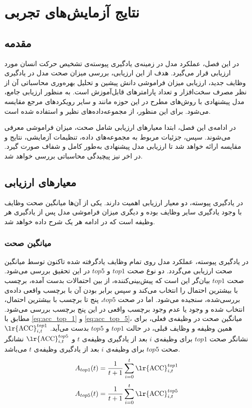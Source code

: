 \chapter{نتایج آزمایش‌های تجربی}
\label{chap4:results}
\section{مقدمه}
در این فصل، عملکرد مدل  در زمینه‌ی یادگیری پیوسته‌ی تشخیص حرکت انسان مورد ارزیابی قرار می‌گیرد. هدف از این ارزیابی، بررسی میزان صحت مدل در یادگیری وظایف جدید، ارزیابی میزان فراموشی دانش پیشین و تحلیل بهره‌وری محاسباتی آن از نظر مصرف سخت‌افزار و تعداد پارامترهای قابل‌آموزش است. به منظور ارزیابی جامع، مدل پیشنهادی با روش‌های مطرح در این حوزه مانند  \cite{pivot}و سایر رویکردهای مرجع مقایسه می‌شود. برای این منظور، از مجموعه‌داده‌های نظیر  \cite{ucf101} و  \cite{hmdb51} استفاده شده است.

در ادامه‌ی‌ این فصل، ابتدا معیارهای ارزیابی شامل صحت، میزان فراموشی معرفی می‌شوند. سپس، جزئیات مربوط به مجموعه‌های داده، تنظیمات آزمایشی، نتایج و مقایسه ارائه خواهد شد تا ارزیابی مدل پیشنهادی به‌طور کامل و شفاف صورت گیرد. در اخر نیز پیچیدگی محاسباتی بررسی خواهد شد. 

\section{معیار‌های ارزیابی}
در یادگیری پیوسته، دو معیار ارزیابی اهمیت دارند. یکی از آن‌ها میانگین صحت وظایف با وجود یادگیری سایر وظایف بوده و دیگری میزان فراموشی مدل پس از یادگیری هر وظیفه است که در ادامه هر یک شرح داده خواهد شد. 
 

\subsection{میانگین صحت}
در یادگیری پیوسته، عملکرد مدل روی تمام وظایف یادگرفته شده تاکنون توسط میانگین صحت ارزیابی می‌گردد. دو نوع صحت $top1$ و $top5$ در این تحقیق بررسی می‌شود. صحت $top1$ بیان‌گر این است که پیش‌بینی‌کننده، از بین احتمالات بدست آمده، برچسب با بیشترین احتمال را انتخاب می‌کند و سپس برابر بودن آن با برچسب واقعی داده‌ی بررسی‌شده، سنجیده می‌‌شود. اما در صحت $top5$، پنج تا برچسب با بیشترین احتمال، انتخاب شده و وجود یا عدم وجود برچسب واقعی در این پنج برچسب بررسی می‌شود. مطابق با \eqref{eq:acc_top_1} و \eqref{eq:acc_top_5}، میانگین صحت در وظیفه‌ی فعلی، برای همین وظیفه و وظایف قبلی، در حالت $top1$ و $top5$ بدست می‌آید. $\text{\lr{ACC}}^{top1}_{i,t}$ نشانگر صحت $top1$ برای وظیفه‌ی $i$ بعد از یادگیری وظیفه‌ی $t$ و $\text{\lr{ACC}}^{top5}_{i,t}$ نشانگر صحت $top5$ برای وظیفه‌ی $i$ بعد از یادگیری وظیفه‌ی $t$ می‌باشد.
\begin{equation}\label{eq:acc_top_1}
	A_{top1}(t) = \frac{1}{t+1} \sum_{i=0}^{t} \text{\lr{ACC}}^{top1}_{i,t}
\end{equation}
\begin{equation}\label{eq:acc_top_5}
	A_{top5}(t) = \frac{1}{t+1} \sum_{i=0}^{t} \text{\lr{ACC}}^{top5}_{i,t}
\end{equation}

